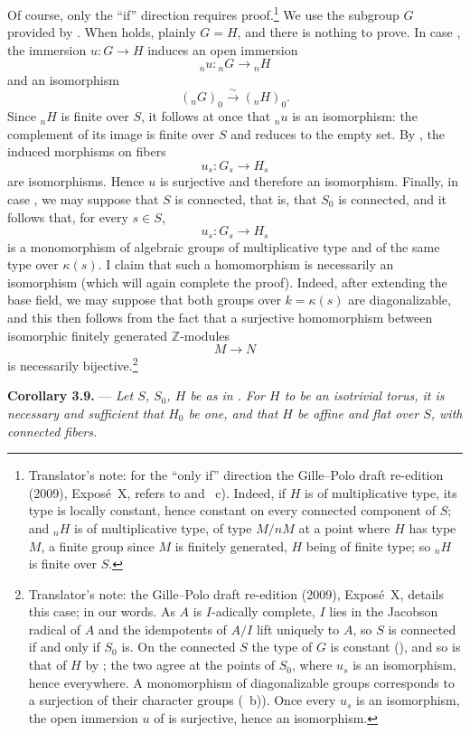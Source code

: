 Of course, only the ``if'' direction requires proof.\footnote{Translator's
note: for the ``only if'' direction the Gille--Polo draft re-edition
(2009), Expos\'e~X, refers to
 and
~c). Indeed, if \(H\) is of
multiplicative type, its type is locally constant, hence constant on
every connected component of \(S\); and \({}_nH\) is of multiplicative
type, of type \(M/nM\) at a point where \(H\) has type \(M\), a finite
group since \(M\) is finitely generated, \(H\) being of finite type; so
\({}_nH\) is finite over \(S\).} We use the
subgroup \(G\) provided by .
When  holds, plainly \(G=H\), and there is nothing to prove.
In case , the immersion \(u:G\to H\) induces an open immersion
\[
  {}_nu:{}_nG\longrightarrow{}_nH
\]
and an isomorphism
\[
  ({}_nG)_0\xrightarrow{\sim}({}_nH)_0.
\]
Since \({}_nH\) is finite over \(S\), it follows at once that
\({}_nu\) is an isomorphism: the complement of its image is finite
over \(S\) and reduces to the empty set. By , the induced
morphisms on fibers
\[
  u_s:G_s\longrightarrow H_s
\]
are isomorphisms. Hence \(u\) is surjective and therefore an
isomorphism. Finally, in case , we may suppose that \(S\) is
connected, that is, that \(S_0\) is connected, and it follows that, for
every \(s\in S\),
\[
  u_s:G_s\longrightarrow H_s
\]
is a monomorphism of algebraic groups of multiplicative type and of
the same type over \(\kappa(s)\). I claim that such a homomorphism is
necessarily an isomorphism (which will again complete the proof).
Indeed, after extending the base field, we may suppose that both groups
over \(k=\kappa(s)\) are diagonalizable, and this then follows from the
fact that a surjective homomorphism between isomorphic finitely
generated \(\mathbb Z\)-modules
\[
  M\longrightarrow N
\]
is necessarily bijective.\footnote{Translator's note: the Gille--Polo
draft re-edition (2009), Expos\'e~X, details this case; in our words. As
\(A\) is \(I\)-adically complete, \(I\) lies in the Jacobson radical of
\(A\) and the idempotents of \(A/I\) lift uniquely to \(A\), so \(S\) is
connected if and only if \(S_0\) is. On the connected \(S\) the type of
\(G\) is constant (), and so is that of
\(H\) by ; the two agree at the points of \(S_0\), where
\(u_s\) is an isomorphism, hence everywhere. A monomorphism of
diagonalizable groups corresponds to a surjection of their character
groups (~b)). Once every \(u_s\) is an isomorphism,
the open immersion \(u\) of  is surjective, hence an
isomorphism.}

\medskip
\noindent{}%
\textbf{Corollary 3.9.} ---
\textit{Let \(S\), \(S_0\), \(H\) be as in . For \(H\) to be an
isotrivial torus, it is necessary and sufficient that \(H_0\) be one,
and that \(H\) be affine and flat over \(S\), with connected fibers.}
